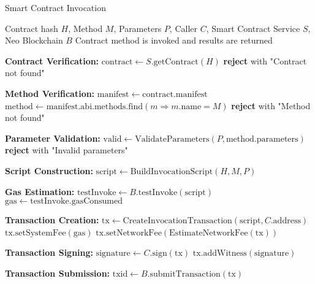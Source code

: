 \begin{tcolorbox}[
    enhanced,
    colback=blue!5!white,
    colframe=blue!75!black,
    arc=5mm,
    boxrule=1.5pt,
    title=Smart Contract Invocation Protocol,
    fonttitle=\bfseries,
    coltitle=white,
    attach boxed title to top left={yshift=-2mm, xshift=5mm},
    boxed title style={colback=blue!75!black, rounded corners},
    shadow={2mm}{-2mm}{0mm}{black!50},
    drop fuzzy shadow
]
\begin{protocol}{Smart Contract Invocation}
\label{prot:smart-contract-invocation}
\begin{algorithmic}[1]
\Require Contract hash $H$, Method $M$, Parameters $P$, Caller $C$, Smart Contract Service $S$, Neo Blockchain $B$
\Ensure Contract method is invoked and results are returned

\State \textbf{Contract Verification:}
\State $\text{contract} \gets S.\text{getContract}(H)$
    \State \textbf{reject} with "Contract not found"
\EndIf

\State \textbf{Method Verification:}
\State $\text{manifest} \gets \text{contract}.\text{manifest}$
\State $\text{method} \gets \text{manifest}.\text{abi}.\text{methods}.\text{find}(m \Rightarrow m.\text{name} = M)$
    \State \textbf{reject} with "Method not found"
\EndIf

\State \textbf{Parameter Validation:}
\State $\text{valid} \gets \text{ValidateParameters}(P, \text{method}.\text{parameters})$
    \State \textbf{reject} with "Invalid parameters"
\EndIf

\State \textbf{Script Construction:}
\State $\text{script} \gets \text{BuildInvocationScript}(H, M, P)$

\State \textbf{Gas Estimation:}
\State $\text{testInvoke} \gets B.\text{testInvoke}(\text{script})$
\State $\text{gas} \gets \text{testInvoke}.\text{gasConsumed}$

\State \textbf{Transaction Creation:}
\State $\text{tx} \gets \text{CreateInvocationTransaction}(\text{script}, C.\text{address})$
\State $\text{tx}.\text{setSystemFee}(\text{gas})$
\State $\text{tx}.\text{setNetworkFee}(\text{EstimateNetworkFee}(\text{tx}))$

\State \textbf{Transaction Signing:}
\State $\text{signature} \gets C.\text{sign}(\text{tx})$
\State $\text{tx}.\text{addWitness}(\text{signature})$

\State \textbf{Transaction Submission:}
\State $\text{txid} \gets B.\text{submitTransaction}(\text{tx})$


\end{algorithmic}
\end{protocol}
\end{tcolorbox}
